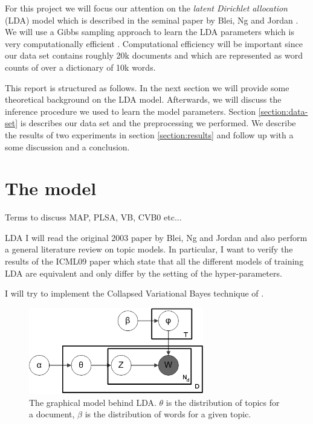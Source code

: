 \documentclass[11pt]{article}
\begin{document}
    For this project we will focus our attention on the \emph{latent Dirichlet allocation} (LDA) model
    which is described in the seminal paper by Blei, Ng and Jordan \cite{Blei2003}. 
    We will use a Gibbs sampling approach to learn the LDA parameters which is very computationally
    efficient \cite{griffiths2004finding}. 
    Computational efficiency will be important since our data set contains roughly 20k documents and 
    which are represented as word counts of over a dictionary of 10k words.
    
    This report is structured as follows.
    In the next section we will provide some theoretical background on the LDA model.
    Afterwards, we will discuss the inference procedure we used to learn the model parameters.
    Section \ref{section:data-set} is describes our data set and the preprocessing we performed.
    We describe the results of two experiments in section \ref{section:results} and follow up
    with a some discussion and a conclusion.



\section{The model}

    Terms to discuss MAP, PLSA, VB, CVB0 etc...
    
    LDA 
    I will read the original 2003 paper by Blei, Ng and Jordan \cite{Blei2003} and also perform a general literature
	review on topic models.
	In particular, I want to verify the results of the ICML09 paper \cite{Teh2009} which state that all the different 
	models of training
	LDA are equivalent and only differ by the setting of the hyper-parameters.
	
	I will try to implement the Collapsed Variational Bayes technique of \cite{Teh2007}.



    \begin{figure}[htb]
    \begin{center}
    \includegraphics[width=3in]{lda-diagram.png}  %
    \caption{ The graphical model behind LDA. $\theta$ is the distribution  of topics for a document,
              $\beta$ is the distribution of words for a given topic.}
    \end{center}
    \end{figure}
\end{document}
